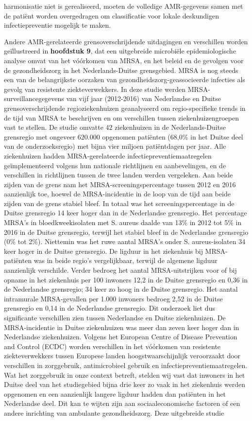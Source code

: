 \documentclass[
]{book}
\begin{document}
harmonisatie niet is gerealiseerd, moeten de volledige AMR-gegevens samen met de patiënt worden overgedragen om classificatie voor lokale deskundigen infectiepreventie mogelijk te maken.

Andere AMR-gerelateerde grensoverschrijdende uitdagingen en verschillen worden geïllustreerd in \textbf{hoofdstuk 9}, dat een uitgebreide microbiële epidemiologische analyse omvat van het vóórkomen van MRSA, en het beleid en de gevolgen voor de gezondheidszorg in het Nederlands-Duitse grensgebied. MRSA is nog steeds een van de belangrijkste oorzaken van gezondheidszorg-geassocieerde infecties als gevolg van resistente ziekteverwekkers. In deze studie werden MRSA-surveillancegegevens van vijf jaar (2012-2016) van Nederlandse en Duitse grensoverschrijdende regioziekenhuizen geanalyseerd om regio-specifieke trends in de tijd van MRSA te beschrijven en om verschillen tussen ziekenhuizengroepen vast te stellen. De studie omvatte 42 ziekenhuizen in de Nederlands-Duitse grensregio met ongeveer 620.000 opgenomen patiënten (68,0\% in het Duitse deel van de onderzoeksregio) met bijna vier miljoen patiëntdagen per jaar. Alle ziekenhuizen hadden MRSA-gerelateerde infectiepreventiemaatregelen geïmplementeerd volgens hun nationale richtlijnen en aanbevelingen, en de verschillen in richtlijnen tussen de twee landen werden vergeleken. Aan beide zijden van de grens nam het MRSA-screeningspercentage tussen 2012 en 2016 aanzienlijk toe, hoewel de MRSA-incidentie in de loop van de tijd aan beide zijden van de grens stabiel bleef. In totaal was het screeningspercentage in de Duitse grensregio 14 keer hoger dan in de Nederlandse grensregio. Het percentage MRSA's in bloedkweekisolaten met S. aureus daalde van 13\% in 2012 tot 5\% in 2016 in de Duitse grensregio, terwijl het stabiel bleef in de Nederlandse grensregio (0\% tot 2\%). Niettemin was het ruwe aantal MRSA's onder S. aureus-isolaten 34 keer hoger in de Duitse grensregio. De ligduur in het ziekenhuis bij MRSA-patiënten was in beide regio's vergelijkbaar, terwijl de algemene ligduur aanzienlijk verschilde. Verder bedroeg het aantal MRSA-uitstrijken voor of bij opname in het ziekenhuis per 100 inwoners 12,2 in de Duitse grensregio en 0,36 in de Nederlandse grensregio; 34 keer zo hoog in de Duitse grensregio. Het aantal intramurale MRSA-gevallen per 1.000 inwoners bedroeg 2,52 in de Duitse grensregio en 0,14 in de Nederlandse grensregio. Dit onderzoek liet dus significante verschillen zien tussen Nederlandse en Duitse ziekenhuizen. De MRSA-incidentie in Duitse ziekenhuizen was meer dan zeven keer hoger dan in Nederlandse ziekenhuizen. Volgens het European Centre of Disease Prevention and Control (ECDC) worden verschillen in het vóórkomen van resistente ziekteverwekkers tussen Europese landen hoogstwaarschijnlijk veroorzaakt door verschillen in zorggebruik, antimicrobieel gebruik en infectiepreventiemaatregelen. Wat het zorggebruik in onze context betreft, stelden wij vast dat inwoners in het Duitse deel van het studiegebied bijna drie keer zo vaak in het ziekenhuis werden opgenomen en een aanzienlijk langere ligduur hadden dan patiënten in het Nederlandse deel. Dit kan te wijten zijn aan sociaaleconomische factoren of een andere inrichting van ambulante gezondheidszorg. Deze uitgebreide studie 
\end{document}
